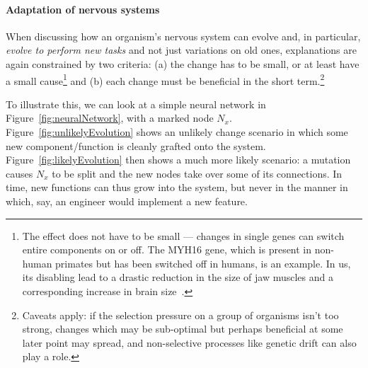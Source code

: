 \documentclass[]{scrartcl}
\theoremstyle{break}
\begin{document}
\paragraph{Adaptation of nervous systems}  When discussing how an organism's nervous system can evolve and, in particular, {\em evolve to perform new tasks} and not just variations on old ones, explanations are again constrained by two criteria: (a) the change has to be small, or at least have a small cause\footnote{The effect does not have to be small --- changes in single genes can switch entire components on or off. The MYH16 gene, which is present in non-human primates but has been switched off in humans, is an example. In us, its disabling lead to a drastic reduction in the size of jaw muscles and a corresponding increase in brain size~\cite{carroll2005}.} and (b) each change must be beneficial in the short term.\footnote{Caveats apply: if the selection pressure on a group of organisms isn't too strong, changes which may be sub-optimal but perhaps beneficial at some later point may spread, and non-selective processes like genetic drift can also play a role.}

To illustrate this, we can look at a simple neural network in Figure~\ref{fig:neuralNetwork}, with a marked node $N_x$. Figure~\ref{fig:unlikelyEvolution} shows an unlikely change scenario in which some new component/function is cleanly grafted onto the system. Figure~\ref{fig:likelyEvolution} then shows a much more likely scenario: a mutation causes $N_x$ to be split and the new nodes take over some of its connections. In time, new functions can thus grow into the system, but never in the manner in which, say, an engineer would implement a new feature.
\end{document}
